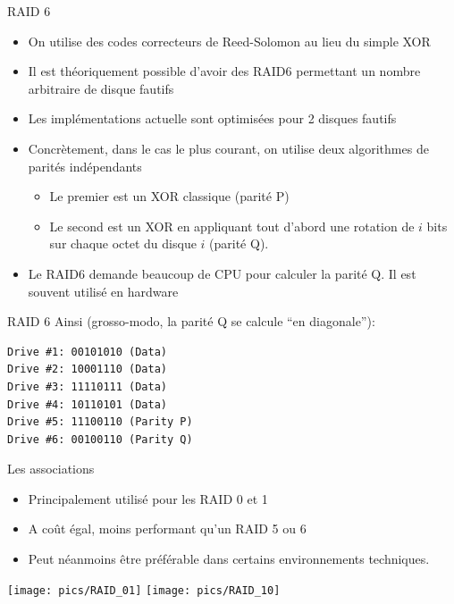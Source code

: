 \begin{frame}[fragile=singleslide]{RAID 6}
  \begin{itemize}
  \item On  utilise des codes  correcteurs de Reed-Solomon au  lieu du
    simple XOR
  \item Il est théoriquement  possible d'avoir des RAID6 permettant un
    nombre arbitraire de disque fautifs
  \item Les  implémentations actuelle  sont optimisées pour  2 disques
    fautifs
  \item Concrètement,  dans le  cas le plus  courant, on  utilise deux
    algorithmes de parités indépendants
    \begin{itemize}
    \item Le premier est un XOR classique (parité P)
    \item Le second est un XOR en appliquant tout d'abord une rotation
      de $i$ bits sur chaque octet du disque $i$ (parité Q).
    \end{itemize}
  \item Le RAID6 demande beaucoup de CPU pour calculer la parité Q. Il
    est souvent utilisé en hardware
  \end{itemize}
\end{frame}

\begin{frame}[fragile=singleslide]{RAID 6}
  Ainsi (grosso-modo, la parité Q se calcule ``en diagonale''):
  \begin{lstlisting}
Drive #1: 00101010 (Data)
Drive #2: 10001110 (Data)
Drive #3: 11110111 (Data)
Drive #4: 10110101 (Data)
Drive #5: 11100110 (Parity P)
Drive #6: 00100110 (Parity Q)
  \end{lstlisting}
\end{frame}

\begin{frame}[fragile=singleslide]{Les associations}
  \begin{itemize}
  \item Principalement utilisé pour les RAID 0 et 1
  \item A coût égal, moins performant qu'un RAID 5 ou 6
  \item  Peut néanmoins être  préférable dans  certains environnements
    techniques.
  \end{itemize}
  \begin{center}
    \texttt{[image: pics/RAID\_01]}
    \texttt{[image: pics/RAID\_10]}
  \end{center}
\end{frame}

